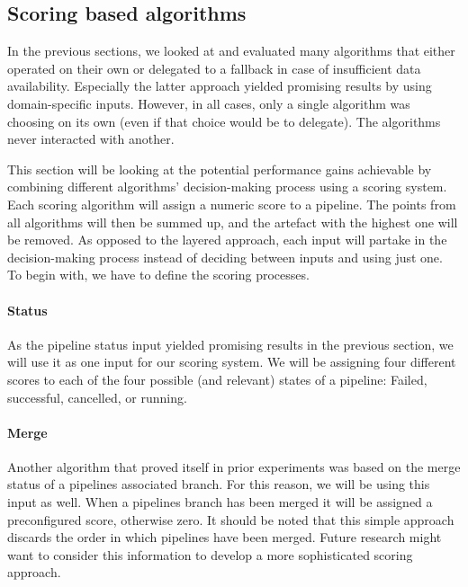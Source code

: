 \subsection{Scoring based algorithms}\label{sec:scoring}
    In the previous sections, we looked at and evaluated many algorithms that either operated on their own or delegated to a fallback in case of insufficient data availability. Especially the latter approach yielded promising results by using domain-specific inputs. However, in all cases, only a single algorithm was choosing on its own (even if that choice would be to delegate). The algorithms never interacted with another.
    
    This section will be looking at the potential performance gains achievable by combining different algorithms' decision-making process using a scoring system. Each scoring algorithm will assign a numeric score to a pipeline. The points from all algorithms will then be summed up, and the artefact with the highest one will be removed. As opposed to the layered approach, each input will partake in the decision-making process instead of deciding between inputs and using just one. To begin with, we have to define the scoring processes.
    
    \paragraph{Status} As the pipeline status input yielded promising results in the previous section, we will use it as one input for our scoring system. We will be assigning four different scores to each of the four possible (and relevant) states of a pipeline: Failed, successful, cancelled, or running.
    
    \paragraph{Merge} Another algorithm that proved itself in prior experiments was based on the merge status of a pipelines associated branch. For this reason, we will be using this input as well. When a pipelines branch has been merged it will be assigned a preconfigured score, otherwise zero. It should be noted that this simple approach discards the order in which pipelines have been merged. Future research might want to consider this information to develop a more sophisticated scoring approach.
    
